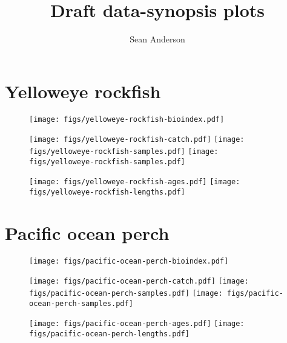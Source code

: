 \documentclass[12pt]{article}
\title{Draft data-synopsis plots}
\author{Sean Anderson}
\begin{document}







% 

\section{Yelloweye rockfish}

\begin{figure}[h]
  \parbox{\textwidth}{
    \parbox{2.5in}{%
         \texttt{[image: figs/yelloweye-rockfish-bioindex.pdf]}
    }
    \parbox{3in}{%
       \texttt{[image: figs/yelloweye-rockfish-catch.pdf]}
       \texttt{[image: figs/yelloweye-rockfish-samples.pdf]}
       \texttt{[image: figs/yelloweye-rockfish-samples.pdf]}
    }}
    \texttt{[image: figs/yelloweye-rockfish-ages.pdf]}
    \texttt{[image: figs/yelloweye-rockfish-lengths.pdf]}
\end{figure}

\clearpage

\section{Pacific ocean perch}

\begin{figure}[h]
  \parbox{\textwidth}{
    \parbox{2.5in}{%
         \texttt{[image: figs/pacific-ocean-perch-bioindex.pdf]}
    }
    \parbox{3in}{%
       \texttt{[image: figs/pacific-ocean-perch-catch.pdf]}
       \texttt{[image: figs/pacific-ocean-perch-samples.pdf]}
       \texttt{[image: figs/pacific-ocean-perch-samples.pdf]}
    }}
    \texttt{[image: figs/pacific-ocean-perch-ages.pdf]}
    \texttt{[image: figs/pacific-ocean-perch-lengths.pdf]}
\end{figure}

\clearpage
\end{document}

